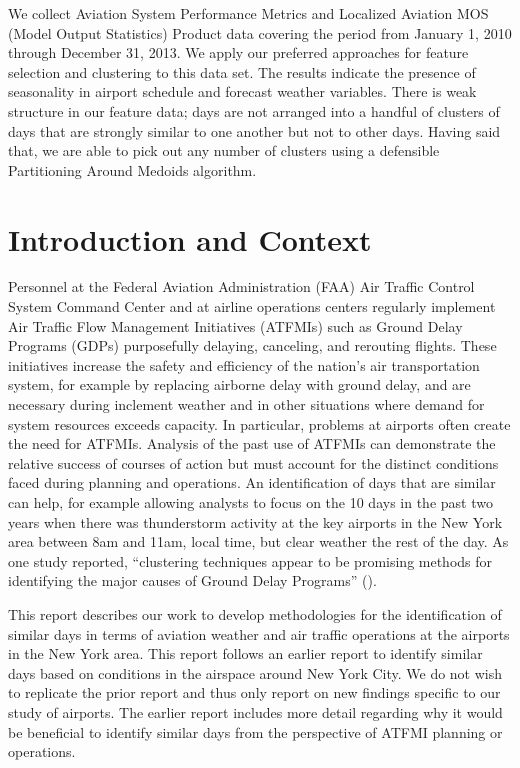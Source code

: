 \documentclass[11pt]{scrartcl}
\begin{document}
We collect Aviation System Performance Metrics and Localized Aviation MOS (Model Output Statistics) Product data covering the period from January 1, 2010 through December 31, 2013.  We apply our preferred approaches for feature selection and clustering to this data set.  The results indicate the presence of seasonality in airport schedule and forecast weather variables.  There is weak structure in our feature data; days are not arranged into a handful of clusters of days that are strongly similar to one another but not to other days.  Having said that, we are able to pick out any number of clusters using a defensible Partitioning Around Medoids algorithm.

\newpage\noindent
\section{Introduction and Context}
Personnel at the Federal Aviation Administration (FAA) Air Traffic Control System Command Center and at airline operations centers regularly implement Air Traffic Flow Management Initiatives (ATFMIs) such as Ground Delay Programs (GDPs) purposefully delaying, canceling, and rerouting flights. These initiatives increase the safety and efficiency of the nation's air transportation system, for example by replacing airborne delay with ground delay, and are necessary during inclement weather and in other situations where demand for system resources exceeds capacity.  In particular, problems at airports often create the need for ATFMIs.  Analysis of the past use of ATFMIs can demonstrate the relative success of courses of action but must account for the distinct conditions faced during planning and operations.  An identification of days that are similar can help, for example allowing analysts to focus on the 10 days in the past two years when there was thunderstorm activity at the key airports in the New York area between 8am and 11am, local time, but clear weather the rest of the day.  As one study reported, ``clustering techniques appear to be promising methods for identifying the major causes of Ground Delay Programs'' (\cite{grabbe2013similar}).

This report describes our work to develop methodologies for the identification of similar days in terms of aviation weather and air traffic operations at the airports in the New York area.  This report follows an earlier report to identify similar days based on conditions in the airspace around New York City.  We do not wish to replicate the prior report and thus only report on new findings specific to our study of airports.  The earlier report includes more detail regarding why it would be beneficial to identify similar days from the perspective of ATFMI planning or operations.
\end{document}
